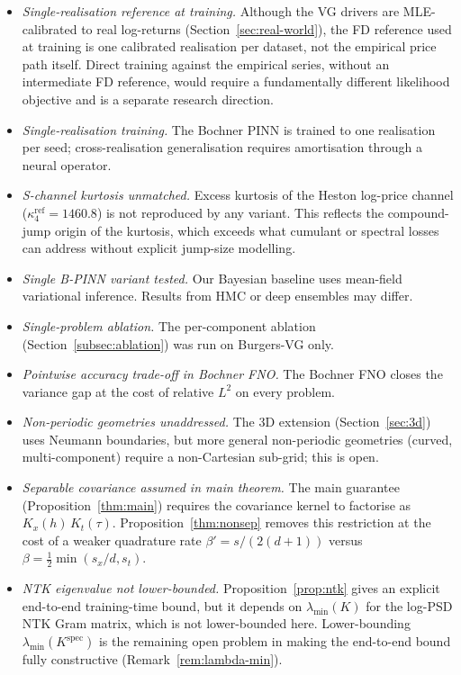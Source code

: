 \documentclass[review,12pt]{elsarticle}
\begin{document}
\begin{itemize}
\item \emph{Single-realisation reference at training.} Although the
VG drivers are MLE-calibrated to real log-returns
(Section~\ref{sec:real-world}), the FD reference used at training is
one calibrated realisation per dataset, not the empirical price path
itself. Direct training against the empirical series, without an
intermediate FD reference, would require a fundamentally different
likelihood objective and is a separate research direction.
\item \emph{Single-realisation training.} The Bochner PINN is
trained to one realisation per seed; cross-realisation
generalisation requires amortisation through a neural operator.
\item \emph{S-channel kurtosis unmatched.} Excess kurtosis of
the Heston log-price channel (\(\kappa_4^{\mathrm{ref}} = 1460.8\))
is not reproduced by any variant. This reflects the compound-jump
origin of the kurtosis, which exceeds what cumulant or spectral
losses can address without explicit jump-size modelling.
\item \emph{Single B-PINN variant tested.} Our Bayesian baseline
uses mean-field variational inference. Results from HMC or deep
ensembles may differ.
\item \emph{Single-problem ablation.} The per-component ablation
(Section~\ref{subsec:ablation}) was run on Burgers-VG only.
\item \emph{Pointwise accuracy trade-off in Bochner FNO.} The
Bochner FNO closes the variance gap at the cost of relative
$L^2$ on every problem.
\item \emph{Non-periodic geometries unaddressed.} The 3D extension
(Section~\ref{sec:3d}) uses Neumann boundaries, but more general
non-periodic geometries (curved, multi-component) require a
non-Cartesian sub-grid; this is open.
\item \emph{Separable covariance assumed in main theorem.} The main
guarantee (Proposition~\ref{thm:main}) requires the covariance kernel
to factorise as $K_x(h)\,K_t(\tau)$. Proposition~\ref{thm:nonsep}
removes this restriction at the cost of a weaker quadrature rate
$\beta'=s/(2(d+1))$ versus $\beta=\tfrac{1}{2}\min(s_x/d,s_t)$.
\item \emph{NTK eigenvalue not lower-bounded.}
Proposition~\ref{prop:ntk} gives an explicit end-to-end training-time
bound, but it depends on $\lambda_{\min}(K)$ for the log-PSD NTK Gram
matrix, which is not lower-bounded here. Lower-bounding
$\lambda_{\min}(K^{\mathrm{spec}})$ is the remaining open problem
in making the end-to-end bound fully constructive
(Remark~\ref{rem:lambda-min}).
\end{itemize}
\end{document}
